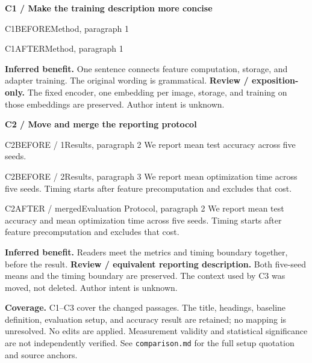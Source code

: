 \documentclass[11pt]{article}
\begin{document}
{\large\bfseries\color{rcInk}C1 / Make the training description more concise}
\begin{rcPassage}{C1}{BEFORE}{Method, paragraph 1}
\end{rcPassage}
\begin{rcPassage}{C1}{AFTER}{Method, paragraph 1}
\end{rcPassage}
{\small\textbf{Inferred benefit.} One sentence connects feature computation,
storage, and adapter training. The original wording is grammatical.
\textbf{Review / exposition-only.} The fixed encoder, one embedding per image,
storage, and training on those embeddings are preserved. Author intent is unknown.}

\vspace{8pt}
{\large\bfseries\color{rcInk}C2 / Move and merge the reporting protocol}
\begin{rcPassage}{C2}{BEFORE / 1}{Results, paragraph 2}
We report mean test accuracy across five seeds.
\end{rcPassage}
\begin{rcPassage}{C2}{BEFORE / 2}{Results, paragraph 3}
We report mean optimization time across five seeds. Timing starts after
feature precomputation and excludes that cost.
\end{rcPassage}
\begin{rcPassage}{C2}{AFTER / merged}{Evaluation Protocol, paragraph 2}
We report mean test accuracy and mean optimization time across five seeds.
Timing starts after feature precomputation and excludes that cost.
\end{rcPassage}
{\small\textbf{Inferred benefit.} Readers meet the metrics and timing boundary
together, before the result. \textbf{Review / equivalent reporting description.}
Both five-seed means and the timing boundary are preserved. The context used by
C3 was moved, not deleted. Author intent is unknown.}

\vfill
{\footnotesize\color{rcMuted}\textbf{Coverage.} C1--C3 cover the changed passages.
The title, headings, baseline definition, evaluation setup, and accuracy result
are retained; no mapping is unresolved. No edits are applied. Measurement
validity and statistical significance are not independently verified.
See \texttt{comparison.md} for the full setup quotation and source anchors.}
\end{document}
